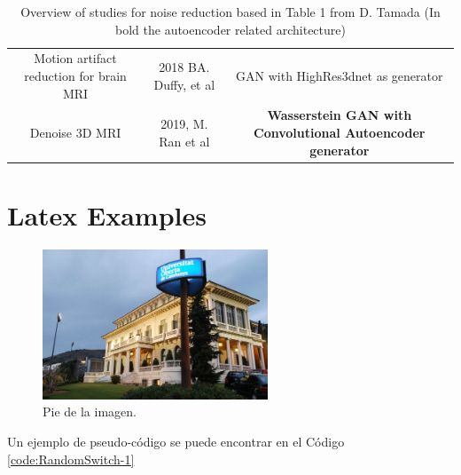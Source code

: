 \begin{table}[!ht]
\begin{tabularx}{\textwidth}{C C C}
        \hline
        \\
        \hline
        
        Motion artifact reduction for brain MRI & 2018 BA. Duffy, et al \cite{ganHR3d} & GAN with HighRes3dnet as generator \\
        
        Denoise 3D MRI & 2019, M. Ran et al \cite{wganautoencoder} & \textbf{Wasserstein GAN with Convolutional Autoencoder generator} \\
 
    \hline
    \end{tabularx}
    \caption{Overview of studies for noise reduction based in Table 1 from D. Tamada \cite{tamada2020review} (In bold the autoencoder related architecture)}
    \label{table:paper_overview}
\end{table}

    



\iffalse
\section{Latex Examples}

\begin{figure}
	\centering
	\includegraphics[width=0.6\textwidth]{figs/image1.png}
	\caption{Pie de la imagen.}
	\label{fig:context-anoni1}
\end{figure}



Un ejemplo de pseudo-código se puede encontrar en el Código \ref{code:RandomSwitch-1}

